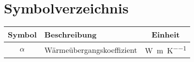 \section*{Symbolverzeichnis}
\label{sec:symbole}
\begin{table}[h!]
	\renewcommand*{\arraystretch}{1.2}
	\centering
	\begin{tabulary}{1.0\textwidth}{C|p{.7\textwidth}|C}
			\hline
			\textbf{Symbol} & \textbf{Beschreibung} & \textbf{Einheit}\\
			\hline
			$\alpha$ & Wärmeübergangskoeffizient & \si{\watt\per\meter \per \kelvin}\\
			\hline		
	\end{tabulary}
\end{table}%
\FloatBarrier

\newpage